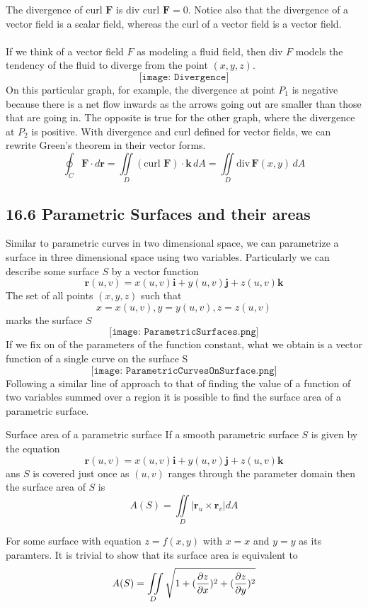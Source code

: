 \documentclass{article}
\begin{document}
	The divergence of curl $\bm{F}$ is div curl $\bm{F}= 0$. Notice also that the divergence
	of a vector field is a scalar field, whereas the curl of a vector field is a
	vector field. \\\\ If we think of a vector field $F$ as modeling a fluid field,
	then div $F$ models the tendency of the fluid to diverge from the point $(x,y,z
	)$.
	\[
		\texttt{[image: Divergence]}
	\]
	On this particular graph, for example, the divergence at point $P_{1}$ is
	negative because there is a net flow inwards as the arrows going out are
	smaller than those that are going in. The opposite is true for the other graph,
	where the divergence at $P_{2}$ is positive. With divergence and curl defined for
	vector fields, we can rewrite Green's theorem in their vector forms.
	\[
		\oint_{C} \bm{F}\cdot d\bm{r}= \iint\limits_{D} (\text{curl }\bm{F}) \cdot \bm
		{k}\,dA = \iint\limits_{D} \text{div}\,\bm{F}(x,y)\,dA
	\]

	\subsection{16.6 Parametric Surfaces and their areas}
	Similar to parametric curves in two dimensional space, we can parametrize a surface
	in three dimensional space using two variables. Particularly we can describe
	some surface $S$ by a vector function
	\[
		\bm{r}(u,v) = x(u,v) \bm{i}+ y(u,v) \bm{j}+ z(u,v) \bm{k}
	\]
	The set of all points $(x,y,z)$ such that
	\[
		x= x(u,v), y = y(u,v), z =z(u,v)
	\]
	marks the surface $S$
	\[
		\texttt{[image: ParametricSurfaces.png]}
	\]
    If we fix on of the parameters of the function constant, what we obtain is a vector function of a single
    curve on the surface S
    \[
        \texttt{[image: ParametricCurvesOnSurface.png]}
    \]
    Following a similar line of approach to that of finding the value of a function of two variables summed over a region
    it is possible to find the surface area of a parametric surface.
    \begin{mybox}{Surface area of a parametric surface}
    If a smooth parametric surface $S$ is given by the equation 
    \[
		\bm{r}(u,v) = x(u,v) \bm{i}+ y(u,v) \bm{j}+ z(u,v) \bm{k}
	\]
    ans $S$ is covered just once as $(u,v)$ ranges through the parameter domain then the surface area of $S$ is
    \[
		A(S) = \iint\limits_{D} \left| \bm{r}_u \times \bm{r}_v \right| dA
	\]
    \end{mybox}
    For some surface with equation $z =f(x,y)$ with $x=x$ and $y=y$ as its paramters.
    It is trivial to show that its surface area is equivalent to
    \[ 
    A(S) = \iint\limits_{D} \sqrt{1 + (\pdv{z}{x})^2 + (\pdv{z}{y})^2}
    \]
\end{document}
